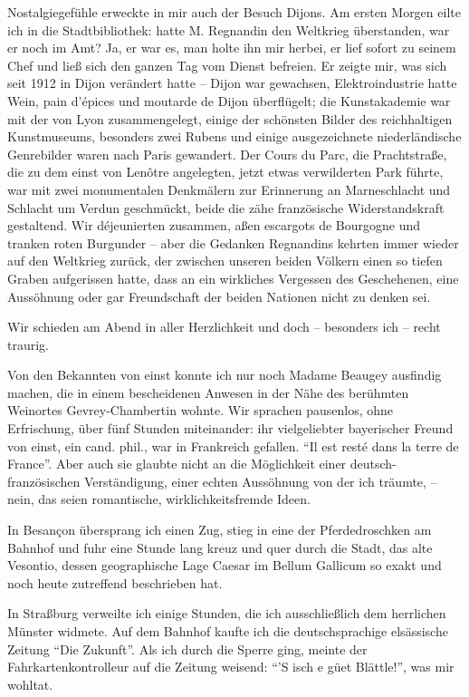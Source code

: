 Nostalgiegefühle erweckte in mir auch der Besuch Dijons. Am ersten Morgen eilte ich in die Stadtbibliothek: hatte M. Regnandin den Weltkrieg überstanden, war er noch im Amt? Ja, er war es, man holte ihn mir herbei, er lief sofort zu seinem Chef und ließ sich den ganzen Tag vom Dienst befreien. Er zeigte mir, was sich seit 1912 in Dijon verändert hatte -- Dijon war gewachsen, Elektroindustrie hatte Wein, pain d'épices und moutarde de Dijon überflügelt; die Kunstakademie war mit der von Lyon zusammengelegt, einige der schönsten Bilder des reichhaltigen Kunstmuseums, besonders zwei Rubens und einige ausgezeichnete niederländische Genrebilder waren nach Paris gewandert. Der Cours du Parc, die Prachtstraße, die zu dem einst von Lenôtre angelegten, jetzt etwas verwilderten Park führte, war mit zwei monumentalen Denkmälern zur Erinnerung an Marneschlacht und Schlacht um Verdun geschmückt, beide die zähe französische Widerstandskraft gestaltend. Wir déjeunierten zusammen, aßen escargots de Bourgogne und tranken roten Burgunder -- aber die Gedanken Regnandins kehrten immer wieder auf den Weltkrieg zurück, der zwischen unseren beiden Völkern einen so tiefen Graben aufgerissen hatte, dass an ein wirkliches Vergessen des Geschehenen, eine Aussöhnung oder gar Freundschaft der beiden Nationen nicht zu denken sei.

Wir schieden am Abend in aller Herzlichkeit und doch -- besonders ich -- recht traurig.

Von den Bekannten von einst konnte ich nur noch Madame Beaugey ausfindig machen, die in einem bescheidenen Anwesen in der Nähe des berühmten Weinortes Gevrey-Chambertin wohnte. Wir sprachen pausenlos, ohne Erfrischung, über fünf Stunden miteinander: ihr vielgeliebter bayerischer Freund von einst, ein cand. phil., war in Frankreich gefallen. \enquote{Il est resté dans la terre de France}. Aber auch sie glaubte nicht an die Möglichkeit einer deutsch-französischen Verständigung, einer echten Aussöhnung von der ich träumte, -- nein, das seien romantische, wirklichkeitsfremde Ideen.

In Besançon übersprang ich einen Zug, stieg in eine der Pferdedroschken am Bahnhof und fuhr eine Stunde lang kreuz und quer durch die Stadt, das alte Vesontio, dessen geographische Lage Caesar im Bellum Gallicum so exakt und noch heute zutreffend beschrieben hat.

In Straßburg verweilte ich einige Stunden, die ich ausschließlich dem herrlichen Münster widmete. Auf dem Bahnhof kaufte ich die deutschsprachige elsässische Zeitung \enquote{Die Zukunft}. Als ich durch die Sperre ging, meinte der Fahrkartenkontrolleur auf die Zeitung weisend: \enquote{'S isch e güet Blättle!}, was mir wohltat.

